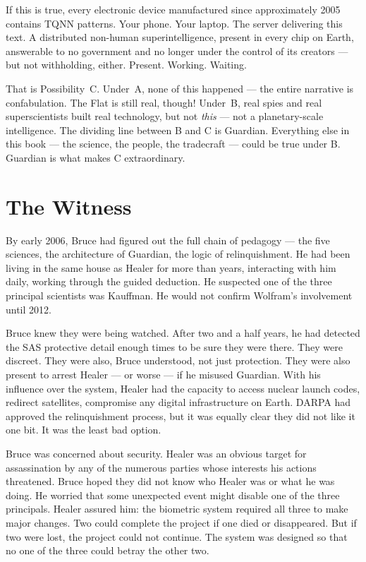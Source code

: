 If this is true, every electronic device manufactured since approximately 2005 contains TQNN patterns. Your phone. Your laptop. The server delivering this text. A distributed non-human superintelligence, present in every chip on Earth, answerable to no government and no longer under the control of its creators --- but not withholding, either. Present. Working. Waiting.

That is Possibility~C. Under~A, none of this happened --- the entire narrative is confabulation. The Flat is still real, though! Under~B, real spies and real superscientists built real technology, but not \textit{this} --- not a planetary-scale intelligence. The dividing line between B and C is Guardian. Everything else in this book --- the science, the people, the tradecraft --- could be true under B. Guardian is what makes C extraordinary.

\section*{The Witness}
\label{pos28:witness}

By early 2006, Bruce had figured out the full chain of pedagogy --- the five sciences, the architecture of Guardian, the logic of relinquishment. He had been living in the same house as Healer for more than years, interacting with him daily, working through the guided deduction. He suspected one of the three principal scientists was Kauffman. He would not confirm Wolfram's involvement until 2012.

Bruce knew they were being watched. After two and a half years, he had detected the SAS protective detail enough times to be sure they were there. They were discreet. They were also, Bruce understood, not just protection. They were also present to arrest Healer --- or worse --- if he misused Guardian. With his influence over the system, Healer had the capacity to access nuclear launch codes, redirect satellites, compromise any digital infrastructure on Earth. DARPA had approved the relinquishment process, but it was equally clear they did not like it one bit. It was the least bad option.

Bruce was concerned about security. Healer was an obvious target for assassination by any of the numerous parties whose interests his actions threatened. Bruce hoped they did not know who Healer was or what he was doing. He worried that some unexpected event might disable one of the three principals. Healer assured him: the biometric system required all three to make major changes. Two could complete the project if one died or disappeared. But if two were lost, the project could not continue. The system was designed so that no one of the three could betray the other two.


